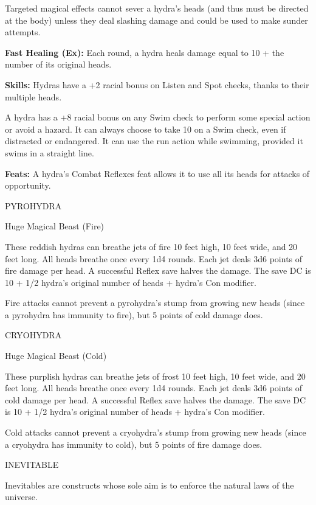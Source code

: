 \documentclass{article}
\begin{document}
Targeted magical effects cannot sever a hydra's heads (and thus must be directed 
at the body) unless they deal slashing damage and could be used to make sunder 
attempts.

\textbf{Fast Healing (Ex):} Each round, a hydra heals damage equal to 10 + the 
number of its original heads. 

\textbf{Skills: }Hydras have a +2 racial bonus on Listen and Spot checks, thanks 
to their multiple heads.

A hydra has a +8 racial bonus on any Swim check to perform some special action 
or avoid a hazard. It can always choose to take 10 on a Swim check, even if distracted 
or endangered. It can use the run action while swimming, provided it swims in a 
straight line.

\textbf{Feats:} A hydra's Combat Reflexes feat allows it to use all its heads for 
attacks of opportunity.

\vspace{12pt}
PYROHYDRA

Huge Magical Beast (Fire)

These reddish hydras can breathe jets of fire 10 feet high, 10 feet wide, and 20 
feet long. All heads breathe once every 1d4 rounds. Each jet deals 3d6 points of 
fire damage per head. A successful Reflex save halves the damage. The save DC is 
10 + 1/2 hydra's original number of heads + hydra's Con modifier.

Fire attacks cannot prevent a pyrohydra's stump from growing new heads (since a 
pyrohydra has immunity to fire), but 5 points of cold damage does.

\vspace{12pt}
CRYOHYDRA

Huge Magical Beast (Cold)

These purplish hydras can breathe jets of frost 10 feet high, 10 feet wide, and 
20 feet long. All heads breathe once every 1d4 rounds. Each jet deals 3d6 points 
of cold damage per head. A successful Reflex save halves the damage. The save DC 
is 10 + 1/2 hydra's original number of heads + hydra's Con modifier.

Cold attacks cannot prevent a cryohydra's stump from growing new heads (since a 
cryohydra has immunity to cold), but 5 points of fire damage does.

\vspace{12pt}
{\LARGE{}INEVITABLE}

Inevitables are constructs whose sole aim is to enforce the natural laws of the 
universe.
\end{document}
